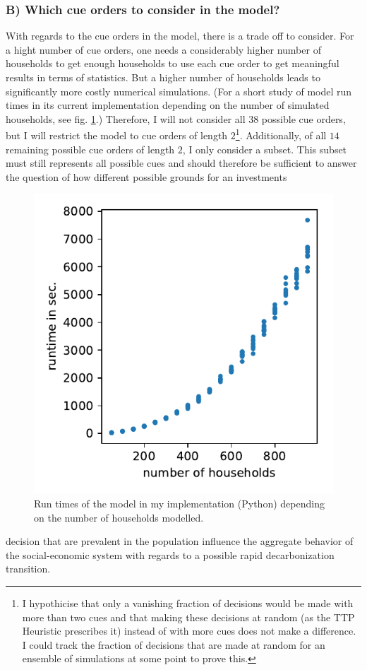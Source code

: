 \subsubsection*{B) Which cue orders to consider in the model?}
With regards to the cue orders in the model, there is a trade off to consider. For a hight number of cue orders, one needs a considerably higher number of households to get enough households to use each cue order to get meaningful results in terms of statistics. But a higher number of households leads to significantly more costly numerical simulations. (For a short study of model run times in its current implementation depending on the number of simulated households, see fig. \ref{fig:runtime}.) Therefore, I will not consider all $38$ possible cue orders, but I will restrict the model to cue orders of length $2$\footnote{I hypothicise that only a vanishing fraction of decisions would be made with more than two cues and that making these decisions at random (as the TTP Heuristic prescribes it) instead of with more cues does not make a difference. I could track the fraction of decisions that are made at random for an ensemble of simulations at some point to prove this.}. Additionally, of all $14$ remaining possible cue orders of length $2$, I only consider a subset. This subset must still represents all possible cues and should therefore be sufficient to answer the question of how different possible grounds for an investments
\begin{figure}
	\vspace{-.4 cm}
        \hspace{-1.5 cm}
        \includegraphics[width = .5 \textwidth]{./figures/runtime.pdf}
        \caption{Run times of the model in my implementation (Python) depending on the number of households modelled.\label{fig:runtime}}
\end{figure}
decision that are prevalent in the population influence the aggregate behavior of the social-economic system with regards to a possible rapid decarbonization transition.\\

